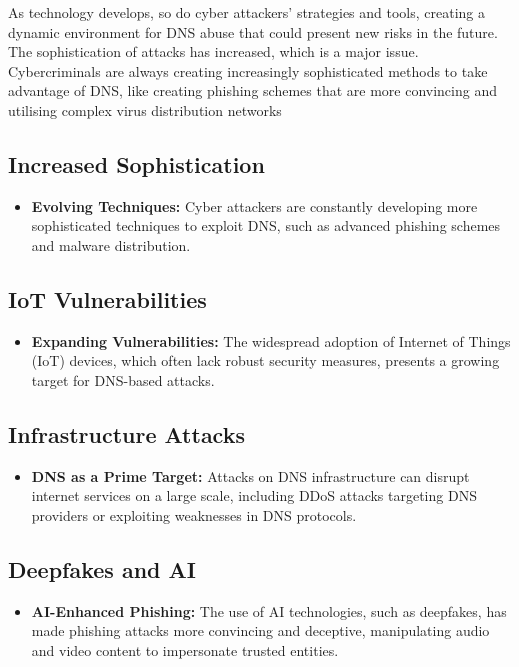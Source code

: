 As technology develops, so do cyber attackers' strategies and tools, creating a dynamic environment for DNS abuse that could present new risks in the future. The sophistication of attacks has increased, which is a major issue. Cybercriminals are always creating increasingly sophisticated methods to take advantage of DNS, like creating phishing schemes that are more convincing and utilising complex virus distribution networks

\subsection{Increased Sophistication}
\begin{itemize}
    \item \textbf{Evolving Techniques:} Cyber attackers are constantly developing more sophisticated techniques to exploit DNS, such as advanced phishing schemes and malware distribution.\cite{icann2022dnsabusetrends, wrightson2014advanced}
\end{itemize}

\subsection{IoT Vulnerabilities}
\begin{itemize}
    \item \textbf{Expanding Vulnerabilities:} The widespread adoption of Internet of Things (IoT) devices, which often lack robust security measures, presents a growing target for DNS-based attacks.\cite{circleid2020dnstrends, mahmoud2015internet}
\end{itemize}

\subsection{Infrastructure Attacks}
\begin{itemize}
    \item \textbf{DNS as a Prime Target:} Attacks on DNS infrastructure can disrupt internet services on a large scale, including DDoS attacks targeting DNS providers or exploiting weaknesses in DNS protocols.\cite{dotmagazine2022dnsabuse, dooley2017dns}
\end{itemize}

\subsection{Deepfakes and AI}
\begin{itemize}
    \item \textbf{AI-Enhanced Phishing:} The use of AI technologies, such as deepfakes, has made phishing attacks more convincing and deceptive, manipulating audio and video content to impersonate trusted entities.\cite{icann2022dnsabusetrends, schick2020deep}
\end{itemize}

